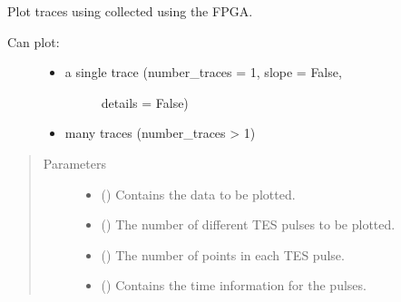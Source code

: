 \documentclass[letterpaper,10pt,english]{sphinxmanual}
\begin{document}
\begin{fulllineitems}
\label{\detokenize{tes:tes.traces.plot_traces}}
\sphinxAtStartPar
Plot traces using collected using the FPGA.
\begin{description}
\item[{Can plot:}] \leavevmode\begin{itemize}
\item {} \begin{description}
\item[{a single trace (number\_traces = 1, slope = False,}] \leavevmode
\sphinxAtStartPar
details = False)

\end{description}

\item {} 
\sphinxAtStartPar
many traces (number\_traces \textgreater{} 1)

\end{itemize}

\end{description}
\begin{quote}\begin{description}
\item[{Parameters}] \leavevmode\begin{itemize}
\item {} 
\sphinxAtStartPar
{} ({\hyperref[\detokenize{tes:tes.data.CaptureData}]{}}) \textendash{} Contains the data to be plotted.

\item {} 
\sphinxAtStartPar
{} () \textendash{} The number of different TES pulses to be plotted.

\item {} 
\sphinxAtStartPar
{} () \textendash{} The number of points in each TES pulse.

\item {} 
\sphinxAtStartPar
{} () \textendash{} Contains the time information for the pulses.


\end{itemize}
\end{description}
\end{quote}
\end{fulllineitems}
\end{document}
